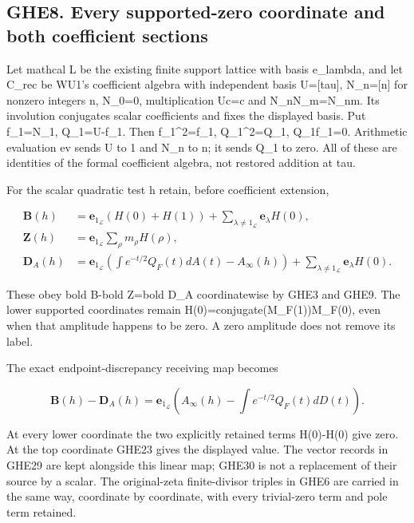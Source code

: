 \subsection{GHE8. Every supported-zero coordinate and both coefficient
sections}\label{ghe8.-every-supported-zero-coordinate-and-both-coefficient-sections}

Let mathcal L be the existing finite support lattice with basis
e\_lambda, and let C\_rec be WU1's coefficient algebra with independent
basis U={[}tau{]}, N\_n={[}n{]} for nonzero integers n, N\_0=0,
multiplication Uc=c and N\_nN\_m=N\_nm. Its involution conjugates scalar
coefficients and fixes the displayed basis. Put f\_1=N\_1, Q\_1=U-f\_1.
Then f\_1\^{}2=f\_1, Q\_1\^{}2=Q\_1, Q\_1f\_1=0. Arithmetic evaluation
ev sends U to 1 and N\_n to n; it sends Q\_1 to zero. All of these are
identities of the formal coefficient algebra, not restored addition at
tau.

For the scalar quadratic test h retain, before coefficient extension,

\[
\begin{aligned}
\boldsymbol B(h)&=\mathbf e_{1_{\mathcal L}}(H(0)+H(1))
+\sum_{\lambda\ne1_{\mathcal L}}\mathbf e_\lambda H(0),\\
\boldsymbol Z(h)&=\mathbf e_{1_{\mathcal L}}\sum_\rho m_\rho H(\rho),\\
\boldsymbol D_A(h)&=\mathbf e_{1_{\mathcal L}}
\left(\int e^{-t/2}Q_F(t)dA(t)-A_\infty(h)\right)
+\sum_{\lambda\ne1_{\mathcal L}}\mathbf e_\lambda H(0).
\end{aligned}
\tag{GHE29}
\]

These obey bold B-bold Z=bold D\_A coordinatewise by GHE3 and GHE9. The
lower supported coordinates remain H(0)=conjugate(M\_F(1))M\_F(0), even
when that amplitude happens to be zero. A zero amplitude does not remove
its label.

The exact endpoint-discrepancy receiving map becomes

\[
\boldsymbol B(h)-\boldsymbol D_A(h)
=\mathbf e_{1_{\mathcal L}}
\left(A_\infty(h)-\int e^{-t/2}Q_F(t)dD(t)\right).
\tag{GHE30}
\]

At every lower coordinate the two explicitly retained terms H(0)-H(0)
give zero. At the top coordinate GHE23 gives the displayed value. The
vector records in GHE29 are kept alongside this linear map; GHE30 is not
a replacement of their source by a scalar. The original-zeta
finite-divisor triples in GHE6 are carried in the same way, coordinate
by coordinate, with every trivial-zero term and pole term retained.

